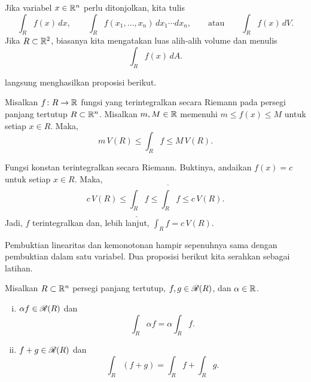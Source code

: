 Jika variabel $x \in {\mathbb{R}}^n$ perlu ditonjolkan, kita tulis
\begin{equation*}
\int_R f(x)\,dx,
\qquad
\int_R f(x_1,\ldots,x_n)\,dx_1 \cdots dx_n,
\qquad
\text{atau}
\qquad
\int_R f(x)\,dV .
\end{equation*}
Jika $R \subset {\mathbb{R}}^2$, biasanya kita mengatakan luas alih-alih volume dan
menulis
\begin{equation*}
\int_R f(x)\,dA .
\end{equation*}

 langsung menghasilkan proposisi berikut.

\begin{prop} \label{mv:intbound:prop}
Misalkan $f \colon R \to {\mathbb{R}}$ fungsi yang terintegralkan secara Riemann pada
persegi panjang tertutup $R \subset {\mathbb{R}}^n$. Misalkan $m, M \in {\mathbb{R}}$ memenuhi
$m \leq f(x) \leq M$ untuk setiap $x \in R$. Maka,
\begin{equation*}
m \, V(R) \leq
\int_{R} f
\leq M \, V(R) .
\end{equation*}
\end{prop}

\begin{example}
Fungsi konstan terintegralkan secara Riemann. Buktinya, andaikan
$f(x) = c$ untuk setiap $x \in R$. Maka,
\begin{equation*}
c \, V(R) \leq \underline{\int_R} f \leq \overline{\int_R} f \leq c\, V(R) .
\end{equation*}
Jadi, $f$ terintegralkan dan, lebih lanjut, $\int_R f = c\,V(R)$.
\end{example}

Pembuktian linearitas dan kemonotonan hampir sepenuhnya sama dengan
pembuktian dalam satu variabel. Dua proposisi berikut kita serahkan sebagai
latihan.

\begin{samepage}
\begin{prop}[Linearitas] \label{mv:intlinearity:prop}
Misalkan $R \subset {\mathbb{R}}^n$ persegi panjang tertutup,
$f,g \in {\mathscr{R}}(R)$, dan $\alpha \in {\mathbb{R}}$.
\begin{enumerate}[(i)]
\item $\alpha f \in {\mathscr{R}}(R)$ dan
\begin{equation*}
\int_R \alpha f = \alpha \int_R f .
\end{equation*}
\item $f+g \in {\mathscr{R}}(R)$ dan
\begin{equation*}
\int_R (f+g) = 
\int_R f
+
\int_R g .
\end{equation*}
\end{enumerate}
\end{prop}
\end{samepage}

